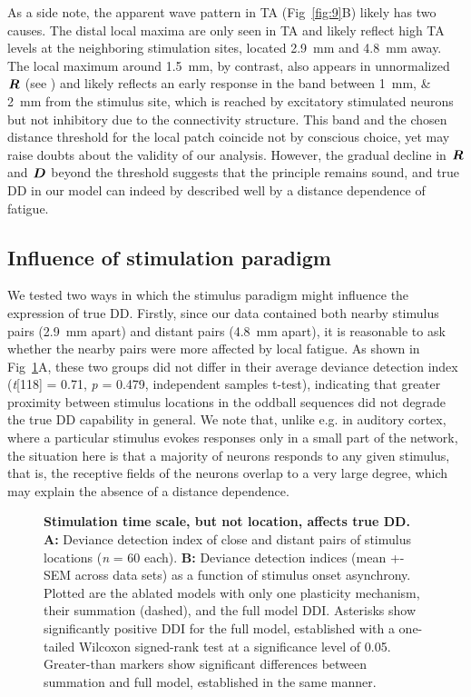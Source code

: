 \documentclass[10pt,letterpaper]{article}
\newcommand{\dev}{\textit{A-as-dev}}
\newcommand{\msc}{\textit{A-in-con}}
\newcommand{\std}{\textit{A-as-std}}
\newcommand{\ifstringequal}[4]{%
  \ifnum\pdfstrcmp{#1}{#2}=0
  #3%
  \else
  #4%
  \fi
}
\newcommand{\seqreplace}[1]{\ifstringequal{dev}{#1}{\dev}{%
    \ifstringequal{std}{#1}{\std}{%
        \ifstringequal{msc}{#1}{\msc}{#1}%
    }%
}}
\newcommand{\R}[3][]{{}^{\seqreplace{#1}}_{}\boldsymbol R^{#2}_{#3}}
\newcommand{\D}[3][]{{}^{\seqreplace{#1}}_{}\boldsymbol D^{#2}_{#3}}
\newcommand{\FIG}[1]{Fig~\ref{fig:#1}}
\newcommand{\statistic}[2]{\textit{#1} = \num{#2}}
\begin{document}
As a side note, the apparent wave pattern in TA (\FIG{9}B) likely has two causes. The distal local maxima are only seen in TA and likely reflect high TA levels at the neighboring stimulation sites, located \qty{2.9}{\milli\meter} and \qty{4.8}{\milli\meter} away. The local maximum around \qty{1.5}{\milli\meter}, by contrast, also appears in unnormalized $\R{}{}$ (see ) and likely reflects an early response in the band between \qtylist{1;2}{\milli\meter} from the stimulus site, which is reached by excitatory stimulated neurons but not inhibitory due to the connectivity structure. This band and the chosen distance threshold for the local patch coincide not by conscious choice, yet may raise doubts about the validity of our analysis. However, the gradual decline in $\R{}{}$ and $\D{}{}$ beyond the threshold suggests that the principle remains sound, and true DD in our model can indeed by described well by a distance dependence of fatigue.

\subsection*{Influence of stimulation paradigm}

We tested two ways in which the stimulus paradigm might influence the expression of true DD. Firstly, since our data contained both nearby stimulus pairs (\qty{2.9}{\milli\meter} apart) and distant pairs (\qty{4.8}{\milli\meter} apart), it is reasonable to ask whether the nearby pairs were more affected by local fatigue. As shown in \FIG{10}A, these two groups did not differ in their average deviance detection index (\textit{t}[118] = \num{0.71}, \statistic{p}{0.479}, independent samples t-test), indicating that greater proximity between stimulus locations in the oddball sequences did not degrade the true DD capability in general.
We note that, unlike e.g. in auditory cortex, where a particular stimulus evokes responses only in a small part of the network, the situation here is that a majority of neurons responds to any given stimulus, that is, the receptive fields of the neurons overlap to a very large degree, which may explain the absence of a distance dependence.

\begin{figure}[!h]
    \caption{%
        \textbf{Stimulation time scale, but not location, affects true DD.}
        \textbf{A:} Deviance detection index of close and distant pairs of stimulus locations (\statistic{n}{60} each).
        \textbf{B:} Deviance detection indices (mean +- SEM across data sets) as a function of stimulus onset asynchrony. Plotted are the ablated models with only one plasticity mechanism, their summation (dashed), and the full model DDI. Asterisks show significantly positive DDI for the full model, established with a one-tailed Wilcoxon signed-rank test at a significance level of 0.05. Greater-than markers show significant differences between summation and full model, established in the same manner.
    }
    \label{fig:10}
\end{figure}
\end{document}

